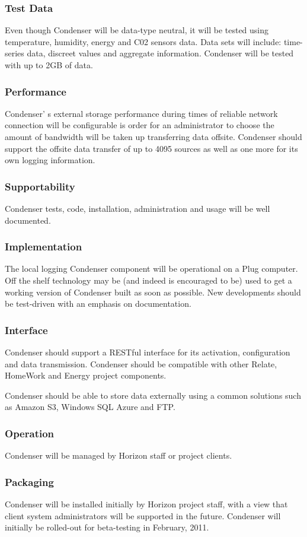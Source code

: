 		\subsubsection{Test Data}
Even though Condenser will be data-type neutral, it will be tested using temperature, humidity, energy and C02 sensors data. Data sets will include: time-series data, discreet values and aggregate information. Condenser will be tested with up to 2GB of data.		
		\subsubsection{Performance}
Condenser'	s external storage performance during times of reliable network connection will be configurable is order for an administrator to choose the amount of bandwidth will be taken up transferring data offsite. Condenser should support the offsite data transfer of up to 4095 sources as well as one more for its own logging information. 	
		\subsubsection{Supportability}
Condenser tests, code, installation, administration and usage will be well documented.	
		\subsubsection{Implementation}
The local logging Condenser component will be operational on a Plug computer. Off the shelf technology may be (and indeed is encouraged to be) used to get a working version of Condenser built as soon as possible. New developments should be test-driven with an emphasis on documentation. 		
		\subsubsection{Interface}
Condenser should support a RESTful interface for its activation, configuration and data transmission. Condenser should be compatible with other Relate, HomeWork and Energy project components.

Condenser should be able to store data externally using a common solutions such as	Amazon S3, Windows SQL Azure and FTP.
		\subsubsection{Operation}
Condenser will be managed by Horizon staff or project clients.		
		\subsubsection{Packaging}
Condenser will be installed initially by Horizon project staff, with a view that client system administrators will be supported in the future. Condenser will initially be rolled-out for beta-testing in February, 2011.  		
